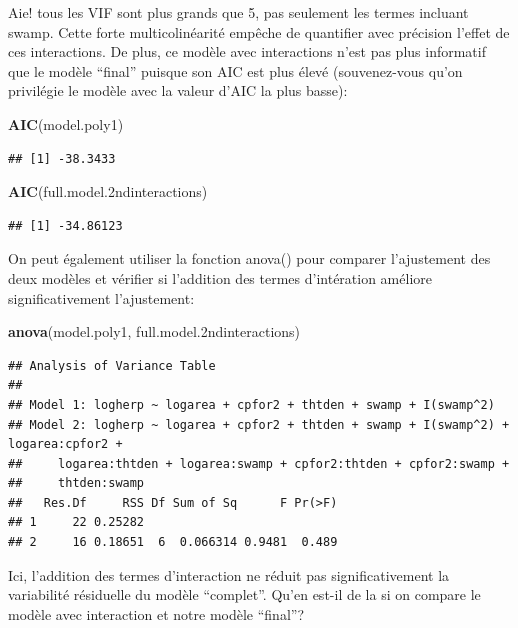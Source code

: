 \documentclass[12pt,]{book}
\newenvironment{Shaded}{\begin{snugshade}}{\end{snugshade}}
\newcommand{\FloatTok}[1]{\textcolor[rgb]{0.00,0.00,0.81}{#1}}
\newcommand{\KeywordTok}[1]{\textcolor[rgb]{0.13,0.29,0.53}{\textbf{#1}}}
\newcommand{\NormalTok}[1]{#1}
\begin{document}
Aie! tous les VIF sont plus grands que 5, pas seulement les termes incluant swamp. Cette forte multicolinéarité empêche de quantifier avec précision l'effet de ces interactions. De plus, ce modèle avec interactions n'est pas plus informatif que le modèle ``final'' puisque son AIC est plus élevé (souvenez-vous qu'on privilégie le modèle avec la valeur d'AIC la plus basse):

\begin{Shaded}
\begin{Highlighting}[]
\KeywordTok{AIC}\NormalTok{(model.poly1)}
\end{Highlighting}
\end{Shaded}

\begin{verbatim}
## [1] -38.3433
\end{verbatim}

\begin{Shaded}
\begin{Highlighting}[]
\KeywordTok{AIC}\NormalTok{(full.model}\FloatTok{.2}\NormalTok{ndinteractions)}
\end{Highlighting}
\end{Shaded}

\begin{verbatim}
## [1] -34.86123
\end{verbatim}

On peut également utiliser la fonction anova() pour comparer l'ajustement des deux modèles et vérifier si l'addition des termes d'intération améliore significativement l'ajustement:

\begin{Shaded}
\begin{Highlighting}[]
\KeywordTok{anova}\NormalTok{(model.poly1, full.model}\FloatTok{.2}\NormalTok{ndinteractions)}
\end{Highlighting}
\end{Shaded}

\begin{verbatim}
## Analysis of Variance Table
## 
## Model 1: logherp ~ logarea + cpfor2 + thtden + swamp + I(swamp^2)
## Model 2: logherp ~ logarea + cpfor2 + thtden + swamp + I(swamp^2) + logarea:cpfor2 + 
##     logarea:thtden + logarea:swamp + cpfor2:thtden + cpfor2:swamp + 
##     thtden:swamp
##   Res.Df     RSS Df Sum of Sq      F Pr(>F)
## 1     22 0.25282                           
## 2     16 0.18651  6  0.066314 0.9481  0.489
\end{verbatim}

Ici, l'addition des termes d'interaction ne réduit pas significativement la variabilité résiduelle du modèle ``complet''. Qu'en est-il de la si on compare le modèle avec interaction et notre modèle ``final''?
\end{document}
